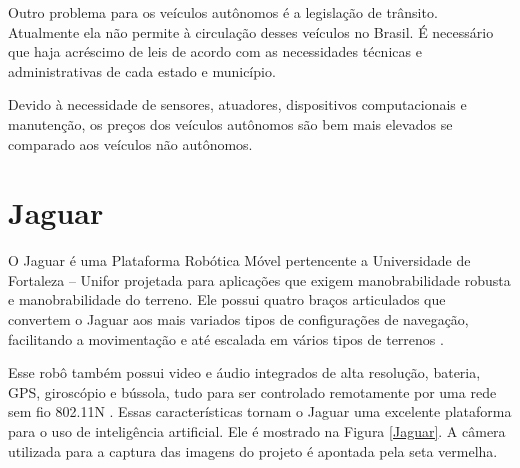 Outro problema para os veículos autônomos é a legislação de trânsito. Atualmente ela não permite à circulação desses veículos no Brasil. É necessário que haja acréscimo de leis de acordo com as necessidades técnicas e administrativas de cada estado e município.\cite{inproceedings}

Devido à necessidade de sensores, atuadores, dispositivos computacionais e manutenção, os preços dos veículos autônomos são bem mais elevados se comparado aos veículos não autônomos. \cite{inproceedings}

\section{Jaguar}
\label{sec:jaguar}

 O Jaguar é uma Plataforma Robótica Móvel pertencente a Universidade de Fortaleza – Unifor projetada para aplicações que exigem manobrabilidade robusta e manobrabilidade do terreno. Ele possui quatro braços articulados que convertem o Jaguar aos mais variados tipos de configurações de navegação, facilitando a movimentação e até escalada em vários tipos de terrenos \cite{jaguar}. 

Esse robô também possui video e áudio integrados de alta resolução, bateria, GPS, giroscópio e bússola, tudo para ser controlado remotamente por uma rede sem fio 802.11N \cite{jaguar}. 
Essas características tornam o Jaguar uma excelente plataforma para o uso de inteligência artificial. Ele é mostrado na Figura \ref{Jaguar}. A câmera utilizada para a captura das imagens do projeto é apontada pela seta vermelha.

\begin{figure}[H]
	\centering
\end{figure}

